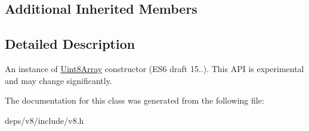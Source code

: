 \subsection*{Additional Inherited Members}


\subsection{Detailed Description}
An instance of \hyperlink{classv8_1_1_uint8_array}{Uint8\+Array} constructor (E\+S6 draft 15..). This A\+P\+I is experimental and may change significantly. 

The documentation for this class was generated from the following file\+:\begin{DoxyCompactItemize}
\item 
deps/v8/include/v8.\+h\end{DoxyCompactItemize}
